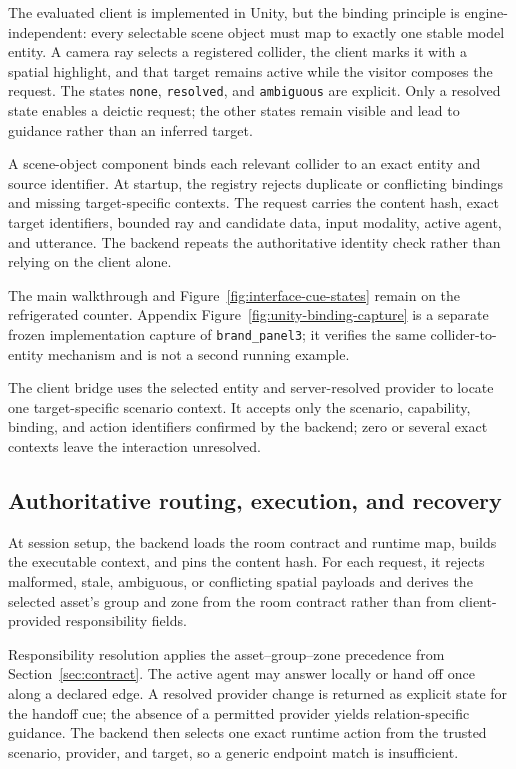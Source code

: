 The evaluated client is implemented in Unity, but the binding principle is
engine-independent: every selectable scene object must map to exactly one
stable model entity.  A camera ray selects a registered collider, the client
marks it with a spatial highlight, and that target remains active while the
visitor composes the request.  The states \texttt{none}, \texttt{resolved}, and
\texttt{ambiguous} are explicit.  Only a resolved state enables a deictic
request; the other states remain visible and lead to guidance rather than an
inferred target.

A scene-object component binds each relevant collider to an exact entity and
source identifier.  At startup, the registry rejects duplicate or conflicting
bindings and missing target-specific contexts.  The request carries the
content hash, exact target identifiers, bounded ray and candidate data, input
modality, active agent, and utterance.  The backend repeats the authoritative
identity check rather than relying on the client alone.

The main walkthrough and Figure~\ref{fig:interface-cue-states} remain on the
refrigerated counter.  Appendix Figure~\ref{fig:unity-binding-capture} is a
separate frozen implementation capture of \texttt{brand\_panel3}; it verifies
the same collider-to-entity mechanism and is not a second running example.

The client bridge uses the selected entity and server-resolved provider to
locate one target-specific scenario context.  It accepts only the scenario,
capability, binding, and action identifiers confirmed by the backend; zero or
several exact contexts leave the interaction unresolved.

\subsection{Authoritative routing, execution, and recovery}

At session setup, the backend loads the room contract and runtime map, builds
the executable context, and pins the content hash.  For each request, it rejects
malformed, stale, ambiguous, or conflicting spatial payloads and derives the
selected asset's group and zone from the room contract rather than from
client-provided responsibility fields.

Responsibility resolution applies the asset--group--zone precedence from
Section~\ref{sec:contract}.  The active agent may answer locally or hand off
once along a declared edge.  A resolved provider change is returned as explicit
state for the handoff cue; the absence of a permitted provider yields
relation-specific guidance.  The backend then selects one exact runtime action
from the trusted scenario, provider, and target, so a generic endpoint match is
insufficient.

